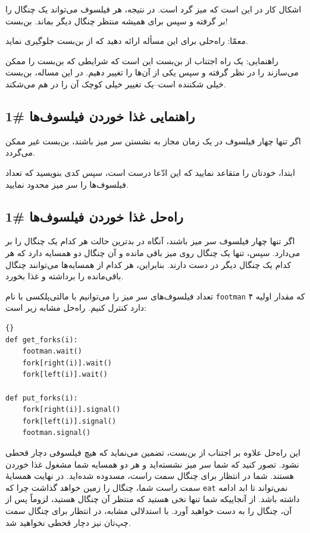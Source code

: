 \documentclass{book}
\newcommand{\clearemptydoublepage}{\newpage\cleardoublepage}
\begin{document}
    اشکال کار در این است که میز گرد است. در نتیجه، هر فیلسوف می‌تواند یک چنگال را بر گرفته 
    و سپس برای همیشه منتظر چنگال دیگر بماند. بن‌بست! 

    معمّا: راه‌حلی برای این مسأله ارائه دهید که از بن‌بست جلوگیری نماید. 

    راهنمایی: یک راه اجتناب از بن‌بست این است که شرایطی که بن‌بست را ممکن می‌سازند را در نظر گرفته  و سپس یکی از آن‌ها را تغییر دهیم. 
    در این مساله، بن‌بست خیلی شکننده است--یک تغییر خیلی کوچک آن را در هم می‌شکند. 

\clearemptydoublepage
\subsection{راهنمایی غذا خوردن فیلسوف‌ها \#1}

    اگر تنها چهار فیلسوف در یک زمان مجاز به نشستن سر میز باشند، بن‌بست غیر ممکن می‌گردد. 

    ابتدا، خودتان را متقاعد نمایید که این ادّعا درست است، سپس کدی بنویسید که تعداد فیلسوف‌ها را سر میز محدود نمایید. 


\clearemptydoublepage
\subsection{راه‌حل غذا خوردن فیلسوف‌ها  \#1}

    اگر تنها چهار فیلسوف سر میز باشند، آنگاه در بدترین حالت هر کدام یک چنگال را بر می‌دارد. سپس، تنها یک چنگال روی میز باقی‌ مانده و 
    آن چنگال دو همسایه دارد که هر کدام یک چنگال دیگر در دست دارند. بنابراین، هر کدام از همسایه‌ها می‌توانند چنگال باقی‌مانده را برداشته و غذا بخورد. 

    تعداد فیلسوف‌های سر میز را می‌توانیم با مالتی‌پلکسی با نام {\tt footman} که مقدار اولیه ۴ دارد کنترل کنیم. 
    راه‌حل مشابه زیر است: 

\begin{latin}
\begin{lstlisting}[title=\rl{راه‌حل غذا خوردن فیلسوف‌ها \#1}]{}
def get_forks(i):
    footman.wait()
    fork[right(i)].wait()
    fork[left(i)].wait()

def put_forks(i):
    fork[right(i)].signal()
    fork[left(i)].signal()
    footman.signal()
\end{lstlisting}
\end{latin}

    این راه‌حل علاوه بر اجتناب از بن‌بست،  تضمین می‌نماید که هیچ فیلسوفی دچار قحطی نشود. 
    تصور کنید که شما سر میز نشسته‌اید و هر دو همسایه شما مشغول غذا خوردن هستند. 
    شما در انتظار برای چنگال سمت راست، مسدوده شده‌اید. در نهایت همسایهٔ سمت راست شما، 
    چنگال را زمین خواهد گذاشت چرا که  {\tt eat} 
    نمی‌تواند تا ابد ادامه داشته باشد. از آنجاییکه شما تنها نخی هستید که منتظر آن چنگال هستید، لزوماً پس از آن، 
    چنگال را به دست خواهید آورد. 
    با استدلالی مشابه، در انتظار برای چنگال سمت چپ‌تان نیز دچار قحطی نخواهید شد. 
    
\end{document}

